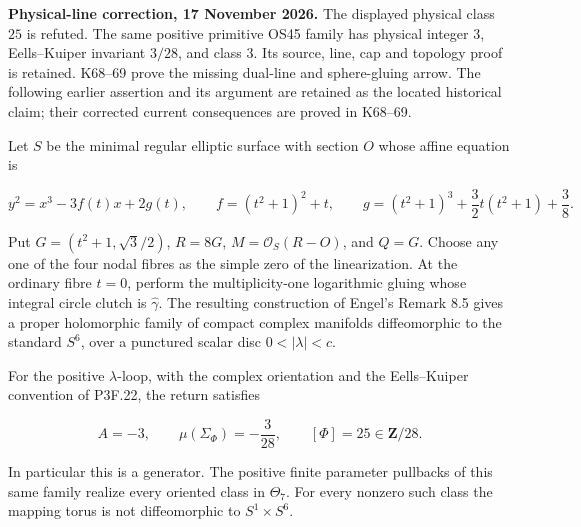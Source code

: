 \begin{theorem}\label{night:P3K.10}
\par\noindent\textbf{Physical-line correction, 17 November 2026.} The displayed physical class \(25\) is refuted. The same positive primitive OS45 family has physical integer \(3\), Eells--Kuiper invariant \(3/28\), and class \(3\). Its source, line, cap and topology proof is retained. K68--69 prove the missing dual-line and sphere-gluing arrow. The following earlier assertion and its argument are retained as the located historical claim; their corrected current consequences are proved in K68--69.\medskip\par 
Let \(S\) be the minimal regular elliptic surface with section \(O\)
whose affine equation is

\[
 y^2=x^3-3f(t)x+2g(t),\qquad
 f=(t^2+1)^2+t,\qquad
 g=(t^2+1)^3+\frac32t(t^2+1)+\frac38.
\]

Put \(G=(t^2+1,\sqrt3/2)\), \(R=8G\),
\(M=\mathcal O_S(R-O)\), and \(Q=G\).  Choose any one of the four
nodal fibres as the simple zero of the linearization.  At the
ordinary fibre \(t=0\), perform the multiplicity-one logarithmic
gluing whose integral circle clutch is \(\widehat\gamma\).
The resulting construction of Engel's Remark 8.5 gives a proper
holomorphic family of compact complex manifolds diffeomorphic to
the standard \(S^6\), over a punctured scalar disc
\(0<|\lambda|<c\).

For the positive \(\lambda\)-loop, with the complex orientation and
the Eells--Kuiper convention of P3F.22, the return satisfies

\[
 A=-3,\qquad \mu(\Sigma_\Phi)=-\frac3{28},\qquad
 [\Phi]=25\in\mathbf Z/28.
\]

In particular this is a generator.  The positive finite parameter
pullbacks of this same family realize every oriented class in
\(\Theta_7\).  For every nonzero such class the mapping torus is
not diffeomorphic to \(S^1\times S^6\).
\end{theorem}

